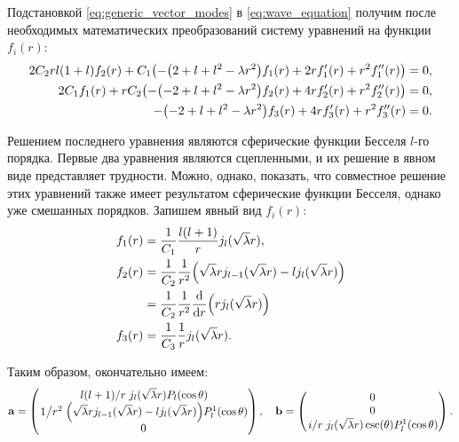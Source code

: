 \documentclass[12pt,a4paper]{article}
\begin{document}
        Подстановкой \autoref{eq:generic_vector_modes} в \autoref{eq:wave_equation} получим после необходимых математических преобразований систему уравнений на функции $f_i(r)$:
        \begin{equation}\begin{aligned}
            2 C_2 r l (1 + l) f_2(r) + C_1 \qty(
                - \qty(2 + l + l^2 - \lambda r^2) f_1(r) +
                2 r f_1'(r) + r^2 f_1''(r)
            ) &= 0, \\
            2 C_1 f_1(r) + r C_2 \qty(
                - \qty(-2 + l + l^2 - \lambda r^2) f_2(r) +
                4 r f_2'(r) + r^2 f_2''(r)
            ) &= 0, \\
            - \qty(-2 + l + l^2 - \lambda r^2) f_3(r) +
                4 r f_3'(r) + r^2 f_3''(r) &= 0.
        \end{aligned}\end{equation}

        Решением последнего уравнения являются сферические функции Бесселя $l$-го порядка. Первые два уравнения являются сцепленными, и их решение в явном виде представляет трудности. Можно, однако, показать, что совместное решение этих уравнений также имеет результатом сферические функции Бесселя, однако уже смешанных порядков. Запишем явный вид $f_i(r)$:
        \begin{equation}\begin{aligned}
            f_1(r) &= \frac{1}{C_1} \frac{l(l+1)}{r} j_l(\sqrt\lambda r), \\
            f_2(r) &= \frac{1}{C_2} \frac{1}{r^2} \qty(
                \sqrt\lambda r j_{l-1}(\sqrt\lambda r) -
                l j_l(\sqrt\lambda r)
            ) \\   &= \frac{1}{C_2} \frac{1}{r^2} \dv{r}(
                r j_{l}(\sqrt\lambda r)
            ) \\
            f_3(r) &= \frac{1}{C_3} \frac{1}{r} j_l(\sqrt\lambda r).
        \end{aligned}\end{equation}

        Таким образом, окончательно имеем:
        \begin{equation}
            \vb{a} = \begin{pmatrix}
                \flatfrac{l(l+1)}{r} j_l(\sqrt\lambda r) P_l(\cos\theta) \\
                \flatfrac{1}{r^2} \qty(
                    \sqrt\lambda r j_{l-1}(\sqrt\lambda r) -
                    l j_l(\sqrt\lambda r)
                ) P_l^1(\cos\theta) \\
                0
            \end{pmatrix} , \quad
            \vb{b} = \begin{pmatrix}
                0 \\
                0 \\
                \flatfrac{i}{r} j_l(\sqrt\lambda r) \csc(\theta) P_l^1(\cos\theta)
            \end{pmatrix} .
        \end{equation}
\end{document}
